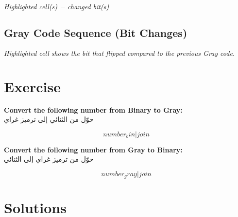 {{{\emph{Highlighted cell(s) = changed bit(s)}
{%


{%
\subsection*{Gray Code Sequence (Bit Changes)}


\emph{Highlighted cell shows the bit that flipped compared to the previous Gray code.}
{%


{%

\section*{Exercise}

\textbf{Convert the following number from Binary to Gray:}\\
حوّل من الثنائي إلى ترميز غراي

\[
  {{ number_bin|join }}
\]

\bigskip

\textbf{Convert the following number from Gray to Binary:}\\
حوّل من ترميز غراي إلى الثنائي

\[
  {{ number_gray|join }}
\]

{%

\section*{Solutions}

}}}}}}}}
